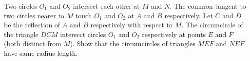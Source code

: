 Two circles $O_1$ and $O_2$ intersect each other at $M$ and $N$. The common tangent to two circles nearer to $M$ touch $O_1$ and $O_2$ at $A$ and $B$ respectively. Let $C$ and $D$ be the reflection of $A$ and $B$ respectively with respect to $M$. The circumcircle of the triangle $DCM$ intersect circles $O_1$ and $O_2$ respectively at points $E$ and $F$ (both distinct from $M$). Show that the circumcircles of triangles $MEF$ and $NEF$ have same radius length.